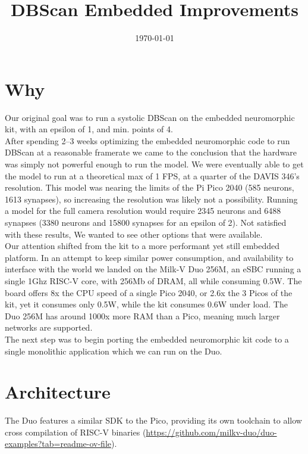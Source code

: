\documentclass[conference]{IEEEtran}{}
\date{\today}
\title{DBScan Embedded Improvements}
\begin{document}
\maketitle
\section{Why}
\label{sec:org972728a}
Our original goal was to run a systolic DBScan on the embedded neuromorphic kit, with an epsilon of 1, and min. points of 4.\\

After spending 2–3 weeks optimizing the embedded neuromorphic code to run DBScan at a reasonable framerate we came to the conclusion that the hardware was simply not powerful enough to run the model. We were eventually able to get the model to run at a theoretical max of 1 FPS, at a quarter of the DAVIS 346's resolution. This model was nearing the limits of the Pi Pico 2040 (585 neurons, 1613 synapses), so increasing the resolution was likely not a possibility. Running a model for the full camera resolution would require 2345 neurons and 6488 synapses (3380 neurons and 15800 synapses for an epsilon of 2). Not satisfied with these results, We wanted to see other options that were available.\\

Our attention shifted from the kit to a more performant yet still embedded platform. In an attempt to keep similar power consumption, and availability to interface with the world we landed on the Milk-V Duo 256M, an eSBC running a single 1Ghz RISC-V core, with 256Mb of DRAM, all while consuming 0.5W. The board offers 8x the CPU speed of a single Pico 2040, or 2.6x the 3 Picos of the kit, yet it consumes only 0.5W, while the kit consumes 0.6W under load. The Duo 256M has around 1000x more RAM than a Pico, meaning much larger networks are supported.\\

The next step was to begin porting the embedded neuromorphic kit code to a single monolithic application which we can run on the Duo.\\
\section{Architecture}
\label{sec:orgf528c97}
The Duo features a similar SDK to the Pico, providing its own toolchain to allow cross compilation of RISC-V binaries (\url{https://github.com/milkv-duo/duo-examples?tab=readme-ov-file}).\\
\end{document}
